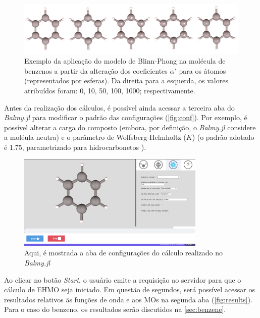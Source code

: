 
\begin{figure}[htb]
\caption{\label{fig:representations} Exemplo da aplicação do modelo de Blinn-Phong na molécula de benzenos a partir da alteração dos coeficientes $\alpha'$ para os átomos (representados por esferas). Da direita para a esquerda, os valores atribuídos foram: 0, 10, 50, 100, 1000; respectivamente.}
	\begin{center}
		\includegraphics[width=1.0\textwidth]{images/shininess(1).png}
	\end{center}
\end{figure}

Antes da realização dos cálculos, é possível ainda acessar a terceira aba do \textit{Balmy.jl} para modificar o padrão das configurações (\autoref{fig:conf}). Por exemplo, é possível alterar a carga do composto (embora, por definição, o \textit{Balmy.jl} considere a moléula neutra) e o parâmetro de Wolfsberg-Helmholtz ($K$) (o padrão adotado é 1.75, parametrizado para hidrocarbonetos \autocite{Hoffmann1963}).

\begin{figure}[htb]
	\caption{\label{fig:conf} Aqui, é mostrada a aba de configurações do cálculo realizado no \textit{Balmy.jl}}
	\begin{center}
		\includegraphics[width=0.8\textwidth]{images/conf.png}
	\end{center}
\end{figure}


Ao clicar no botão \textit{Start}, o usuário emite a requisição ao servidor para que o cálculo de \gls{EHMO} seja iniciado. Em questão de segundos, será possível acessar os resultados relativos ãs funções de onda e aos \gls{MOs} na segunda aba (\autoref{fig:results}). Para o caso do benzeno, os resultados serão discutidos na \autoref{sec:benzene}.

